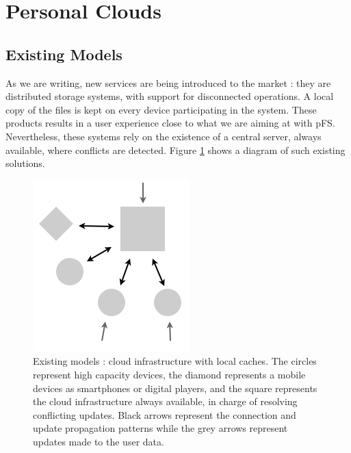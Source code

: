


\section{Personal Clouds}
\label{sec:model}

\subsection {Existing Models}

As we are writing, new services are being introduced to the
market : they are distributed storage systems, with support for
disconnected operations. A local copy of the files is kept on every
device participating in the system. These products results in a user
experience close to what we are aiming at with pFS. Nevertheless, these
systems rely on the existence of a central server, always available,
where conflicts are detected. Figure \ref{OthModel} shows a diagram of
such existing solutions.

\begin{figure}[ht]
\begin{center}
  \includegraphics [scale=0.4] {img/other_model}
  \caption{\label{OthModel}
    {\small Existing models : cloud infrastructure with local
      caches. The circles represent high capacity devices, the diamond
      represents a mobile devices as smartphones or digital players,
      and the square represents the cloud infrastructure always
      available, in charge of resolving conflicting updates. Black
      arrows represent the connection and update propagation patterns
      while the grey arrows represent updates made to the user data.}}
\end{center}
\end{figure}

